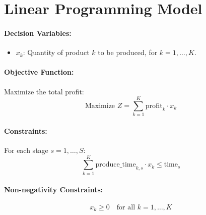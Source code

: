 \documentclass{article}
\begin{document}
\section*{Linear Programming Model}

\paragraph{Decision Variables:}
\begin{itemize}
    \item \( x_k \): Quantity of product \( k \) to be produced, for \( k = 1, \ldots, K \).
\end{itemize}

\paragraph{Objective Function:}

Maximize the total profit:
\[
\text{Maximize } Z = \sum_{k=1}^{K} \text{profit}_k \cdot x_k
\]

\paragraph{Constraints:}

For each stage \( s = 1, \ldots, S \):
\[
\sum_{k=1}^{K} \text{produce\_time}_{k, s} \cdot x_k \leq \text{time}_s
\]

\paragraph{Non-negativity Constraints:}
\[
x_k \geq 0 \quad \text{for all } k = 1, \ldots, K
\]
\end{document}
